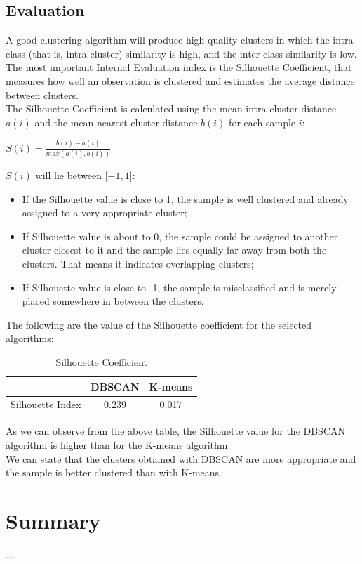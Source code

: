 \documentclass[fleqn,10pt]{SelfArx} %
\begin{document}
\subsection{Evaluation}
A good clustering algorithm will produce high quality clusters in which the intra-class (that is, intra-cluster) similarity is high, and the inter-class similarity is low.\\
The most important Internal Evaluation index is the Silhouette Coefficient, that measures how well an observation is clustered and estimates the average distance between clusters.\\
The Silhouette Coefficient is calculated using the mean intra-cluster distance $a(i)$ and the mean nearest cluster distance $b(i)$ for each sample $i$:\\

\begin{center}
$S(i) = \frac{b(i) - a(i)}{max(a(i), b(i))}$
\end{center}

$S(i)$ will lie between [$ -1,1 $]:
\begin{itemize}
	\item If the Silhouette value is close to 1, the sample is well clustered and already assigned to a very appropriate cluster;
	\item If Silhouette value is about to 0, the sample could be assigned to another cluster closest to it and the sample lies equally far away from both the clusters. That means it indicates overlapping clusters;
	\item If Silhouette value is close to -1, the sample is misclassified and is merely placed somewhere in between the clusters.
\end{itemize}

The following are the value of the Silhouette coefficient for the selected algorithms:

\begin{table}[ht]
\centering
\begin{tabular}{c c c }
	 & DBSCAN & K-means  \\
	\hline
	Silhouette Index & 0.239 & 0.017  \\
\end{tabular}
\caption{Silhouette Coefficient}
\end{table}

As we can observe from the above table, the Silhouette value for the DBSCAN algorithm is higher than for the K-means algorithm.\\
We can state that the clusters obtained with DBSCAN are more appropriate and the sample is better clustered than with K-means.


\section{Summary}
...


\nocite{*}
\printbibliography
\end{document}

